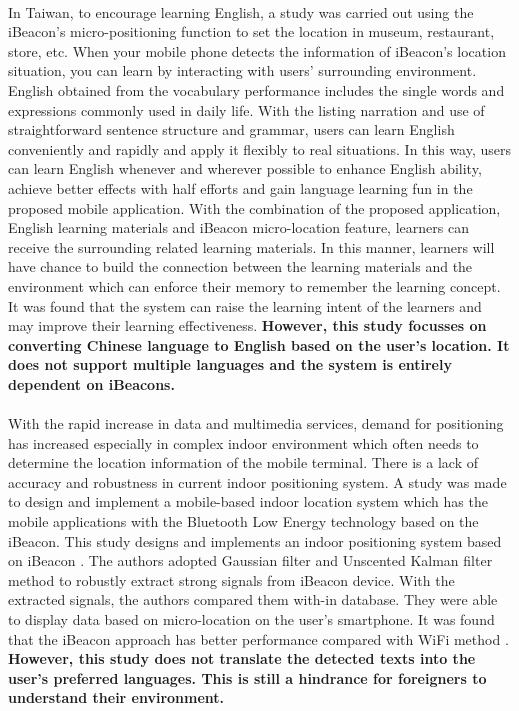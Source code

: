 \documentclass[12pt]{article}
\begin{document}
\paragraph{}In Taiwan, to encourage learning English, a study was carried out using the iBeacon's micro-positioning function to set the location in museum, restaurant, store, etc. When your mobile phone detects the information of iBeacon's location situation, you can learn by interacting with users' surrounding environment. \cite{taiwan} English obtained from the vocabulary performance includes the single words and expressions commonly used in daily life. With the listing narration and use of straightforward sentence structure and grammar, users can learn English conveniently and rapidly and apply it flexibly to real situations. In this way, users can learn English whenever and wherever possible to enhance English ability, achieve better effects with half efforts and gain language learning fun in the proposed mobile application. With the combination of the proposed application, English learning materials and iBeacon micro-location feature, learners can receive the surrounding related learning materials. In this manner, learners will have chance to build the connection between the learning materials and the environment which can enforce their memory to remember the learning concept.  \cite{taiwan} It was found that the system can raise the learning intent of the learners and may improve their learning effectiveness. \textbf{However, this study focusses on converting Chinese language to English based on the user's location. It does not support multiple languages and the system is entirely dependent on iBeacons.}

\paragraph{} With the rapid increase in data and multimedia services, demand for positioning has increased especially in complex indoor environment which often needs to determine the location information of the mobile terminal. \cite{services} There is a lack of accuracy and robustness in current indoor positioning system. A study was made to design and implement a mobile-based indoor location system which has the mobile applications with the Bluetooth Low Energy technology based on the iBeacon. This study designs and implements an indoor positioning system based on iBeacon \cite{indoor}. The authors adopted Gaussian filter and Unscented Kalman filter method to robustly extract strong signals from iBeacon device. With the extracted signals, the authors compared them with-in database. They were able to display data based on micro-location on the user's smartphone.  It was found that the iBeacon approach has better performance compared with WiFi method  \cite{indoor}. \textbf{However, this study does not translate the detected texts into the user's preferred languages. This is still a hindrance for foreigners to understand their environment.}
\end{document}
